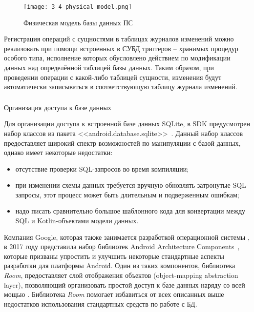 \begin{figure}[p]
    \centering
    \texttt{[image: 3\_4\_physical\_model.png]}
    \caption{Физическая модель базы данных ПС}
    \label{fig:design:database:model:diagram}
\end{figure}

Регистрация операций с сущностями в таблицах журналов изменений можно реализовать при помощи встроенных в СУБД \sqlite триггеров -- хранимых процедур особого типа, исполнение которых обусловлено действием по модификации данных над определённой таблицей базы данных.
Таким образом, при проведении операции с какой-либо таблицей сущности, изменения будут автоматически записываться в соответствующую таблицу журнала изменений.

\subsubsection{} Организация доступа к базе данных
\label{sec:design:database:implementation}

Для организации доступа к встроенной базе данных SQLite, в \andro SDK предусмотрен набор классов из пакета <<android.database.sqlite>>~\cite{android_sqlite}.
Данный набор классов предоставляет широкий спектр возможностей по манипуляции с базой данных, однако имеет некоторые недостатки:
\begin{itemize}
    \item отсутствие проверки SQL-запросов во время компиляции;
    \item при изменении схемы данных требуется вручную обновлять затронутые SQL-запросы, этот процесс может быть длительным и подверженным ошибкам;
    \item надо писать сравнительно большое шаблонного кода для конвертации между SQL и Kotlin-объектами модели данных.
\end{itemize}

Компания Google, которая также занимается разработкой операционной системы \andro, в 2017 году представила набор библиотек Android Architecture Com\-po\-nents~\cite{android_components}, которые призваны упростить и улучшить некоторые стандартные аспекты разработки для платформы Android.
Один из таких компонентов, библиотека \emph{Room}, предоставляет слой отображения  объектов (object-mapping abstraction layer), позволяющий организовать простой доступ к базе данных наряду со всей мощью \sqlite.
Библиотека \emph{Room} помогает избавиться от всех описанных выше недостатков использования стандартных средств по работе с БД.

